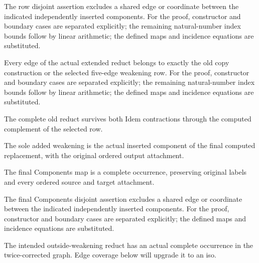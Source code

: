 The row disjoint assertion excludes a shared edge or coordinate between the indicated independently inserted components.
For the proof, constructor and boundary cases are separated explicitly; the remaining natural-number index bounds follow by linear arithmetic; the defined maps and incidence equations are substituted.
\par{}

Every edge of the actual extended reduct belongs to exactly the old copy construction or the selected five-edge weakening row.
For the proof, constructor and boundary cases are separated explicitly; the remaining natural-number index bounds follow by linear arithmetic; the defined maps and incidence equations are substituted.
\par{}

The complete old reduct survives both Idem contractions through the computed complement of the selected row.
\par{}

The sole added weakening is the actual inserted component of the final computed replacement, with the original ordered output attachment.
\par{}

The final Components map is a complete occurrence, preserving original labels and every ordered source and target attachment.
\par{}

The final Components disjoint assertion excludes a shared edge or coordinate between the indicated independently inserted components.
For the proof, constructor and boundary cases are separated explicitly; the defined maps and incidence equations are substituted.
\par{}

The intended outside-weakening reduct has an actual complete occurrence in the twice-corrected graph. Edge coverage below will upgrade it to an iso.
\par{}

